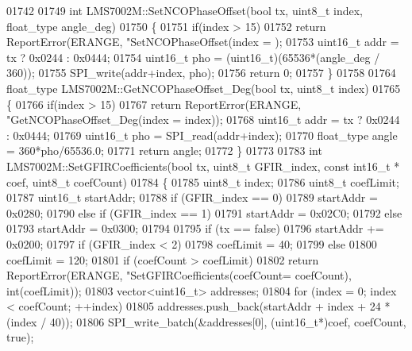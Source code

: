 \begin{DoxyCode}
{{{{{{{{{{{{{{{{{{{{{{{{{{{{{{{{{{{{{{{{{{{{{{{{{{{01742 
01749 \textcolor{keywordtype}{int} LMS7002M::SetNCOPhaseOffset(\textcolor{keywordtype}{bool} tx, uint8\_t index, float_type angle\_deg)
01750 \{
01751     \textcolor{keywordflow}{if}(index > 15)
01752         \textcolor{keywordflow}{return} ReportError(ERANGE, \textcolor{stringliteral}{"SetNCOPhaseOffset(index = %
      );
01753     uint16\_t addr = tx ? 0x0244 : 0x0444;
01754     uint16\_t pho = (uint16\_t)(65536*(angle\_deg / 360));
01755     SPI_write(addr+index, pho);
01756     \textcolor{keywordflow}{return} 0;
01757 \}
01758 
01764 float_type LMS7002M::GetNCOPhaseOffset_Deg(\textcolor{keywordtype}{bool} tx, uint8\_t index)
01765 \{
01766     \textcolor{keywordflow}{if}(index > 15)
01767         \textcolor{keywordflow}{return} ReportError(ERANGE, \textcolor{stringliteral}{"GetNCOPhaseOffset\_Deg(index = %
      index));
01768     uint16\_t addr = tx ? 0x0244 : 0x0444;
01769     uint16\_t pho = SPI_read(addr+index);
01770     float_type angle = 360*pho/65536.0;
01771     \textcolor{keywordflow}{return} angle;
01772 \}
01773 
01783 \textcolor{keywordtype}{int} LMS7002M::SetGFIRCoefficients(\textcolor{keywordtype}{bool} tx, uint8\_t GFIR\_index, \textcolor{keyword}{const} int16\_t *
      coef, uint8\_t coefCount)
01784 \{
01785     uint8\_t index;
01786     uint8\_t coefLimit;
01787     uint16\_t startAddr;
01788     \textcolor{keywordflow}{if} (GFIR\_index == 0)
01789         startAddr = 0x0280;
01790     \textcolor{keywordflow}{else} \textcolor{keywordflow}{if} (GFIR\_index == 1)
01791         startAddr = 0x02C0;
01792     \textcolor{keywordflow}{else}
01793         startAddr = 0x0300;
01794 
01795     \textcolor{keywordflow}{if} (tx == \textcolor{keyword}{false})
01796         startAddr += 0x0200;
01797     \textcolor{keywordflow}{if} (GFIR\_index < 2)
01798         coefLimit = 40;
01799     \textcolor{keywordflow}{else}
01800         coefLimit = 120;
01801     \textcolor{keywordflow}{if} (coefCount > coefLimit)
01802         \textcolor{keywordflow}{return} ReportError(ERANGE, \textcolor{stringliteral}{"SetGFIRCoefficients(coefCount=%
      coefCount), \textcolor{keywordtype}{int}(coefLimit));
01803     vector<uint16\_t> addresses;
01804     \textcolor{keywordflow}{for} (index = 0; index < coefCount; ++index)
01805         addresses.push\_back(startAddr + index + 24 * (index / 40));
01806     SPI_write_batch(&addresses[0], (uint16\_t*)coef, coefCount, \textcolor{keyword}{true});
}}}}}}}}}}}}}}}}}}}}}}}}}}}}}}}}}}}}}}}}}}}}}}}}}}}}}}
\end{DoxyCode}
